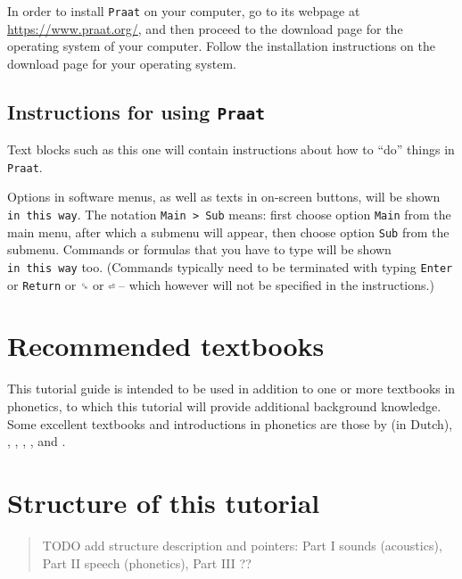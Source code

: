 \documentclass[
]{book}
\begin{document}
In order to install \texttt{Praat} on your computer, go to its webpage at \url{https://www.praat.org/}, and then proceed to the download page for the operating system of your computer. Follow the installation instructions on the download page for your operating system.

\label{tech-layout}
\subsection*{\texorpdfstring{Instructions for using \texttt{Praat}}{Instructions for using Praat}}\label{instructions-for-using-praat}

Text blocks such as this one will contain instructions about how to ``do'' things in \texttt{Praat}.

Options in software menus, as well as texts in on-screen buttons, will be shown \texttt{in\ this\ way}.
The notation \texttt{Main\ \textgreater{}\ Sub} means: first choose option \texttt{Main} from the main menu, after which a submenu will appear, then choose option \texttt{Sub} from the submenu.
Commands or formulas that you have to type will be shown \texttt{in\ this\ way} too. (Commands typically need to be terminated with typing \texttt{Enter} or \texttt{Return} or \texttt{␍} or \texttt{⏎} -- which however will not be specified in the instructions.)

\section{Recommended textbooks}\label{sec:textbooks}

This tutorial guide is intended to be used in addition to one or more textbooks in phonetics, to which this tutorial will provide additional background knowledge.
Some excellent textbooks and introductions in phonetics are those by
\citet{Rietveld_VanHeuven_2009} (in Dutch),
\citet{Johnson_2012},
\citet{Ladefoged_Johnson_2015},
\citet{Reetz_Jongman_2020},
\citet{Beňuš_2021}, and
\citet{Zsiga_2024}.

\section*{Structure of this tutorial}\label{structure-of-this-tutorial}

\begin{quote}
TODO add structure description and pointers: Part I sounds (acoustics), Part II speech (phonetics), Part III ??
\end{quote}
\end{document}
